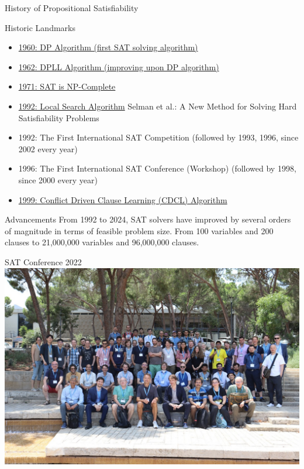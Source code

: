 \documentclass[t]{sdqbeamer}
\begin{document}
\begin{frame}{History of Propositional Satisfiability}
\begin{block}{Historic Landmarks}
	\begin{itemize}\setlength{\itemsep}{1ex}
		\item \href{http://doi.acm.org/10.1145/321033.321034}{1960: DP Algorithm (first SAT solving algorithm)}
		\item \href{https://doi.acm.org/10.1145/368273.368557}{1962: DPLL Algorithm (improving upon DP algorithm)}
		\item \href{https://dl.acm.org/doi/10.1145/800157.805047}{1971: SAT is NP-Complete}
		\item \href{http://www.aaai.org/Library/AAAI/1992/aaai92-068.php}{1992: Local Search Algorithm}
		Selman et al.: A New Method for Solving Hard Satisfiability Problems
		\item 1992: The First International SAT Competition (followed by 1993, 1996, since 2002 every year)
		\item 1996: The First International SAT Conference (Workshop) (followed by 1998, since 2000 every year)
		\item \href{https://doi.org/10.1109/12.769433}{1999: Conflict Driven Clause Learning (CDCL) Algorithm}
	\end{itemize}
\end{block}
\begin{alert}{Advancements}
	From 1992 to 2024, SAT solvers have improved by several orders of magnitude in terms of feasible problem size.
	From 100 variables and 200 clauses to 21,000,000 variables and 96,000,000 clauses.
\end{alert}
\end{frame}

\begin{frame}{SAT Conference 2022}
	\centering
	\includegraphics[height=.75\textheight]{figures/l01/SAT2022-grouppicture.jpg}
\end{frame}
\end{document}
